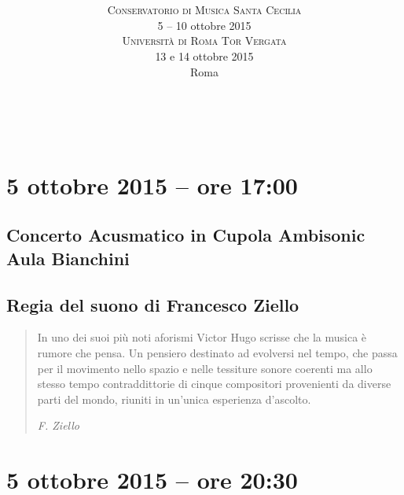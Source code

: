 \documentclass[8pt, twoside, a5paper]{extreport}
\title{
	\svolk{CONSERVATORIO DI MUSICA S. CECILIA} \\
	\fontsize{50}{50}
	\svolk{
		\emph{
			EMUFest 2015
			}
		}
	} %
\author{
	\textsc{Conservatorio di Musica Santa Cecilia} \\
	5 -- 10 ottobre 2015 \\
	\textsc{Università di Roma Tor Vergata} \\
	13 e 14 ottobre 2015 \\
	Roma
}
\date{}
\begin{document}
\pagestyle{empty}
\maketitle 

\clearpage

~\vfill



\clearpage


\section*{5 ottobre 2015 -- ore 17:00}

\subsection*{{\small Concerto Acusmatico in Cupola Ambisonic} \\
	\textsf{Aula Bianchini}}

{\fontsize{30}{30} }

\subsection*{\textsf{Regia del suono di Francesco Ziello}}

\begin{quote}
{\svolk \small
In uno dei suoi più noti aforismi Victor Hugo scrisse che la musica è rumore che pensa.
Un pensiero destinato ad evolversi nel tempo, che passa per il movimento nello spazio e nelle tessiture sonore coerenti ma allo stesso tempo contraddittorie di cinque compositori provenienti da diverse parti del mondo,
riuniti in un’unica esperienza d’ascolto.}

\emph{F. Ziello}
\end{quote}


\begin{multicols}{2}




\end{multicols}

\clearpage

\section*{5 ottobre 2015 -- ore 20:30}
\end{document}
